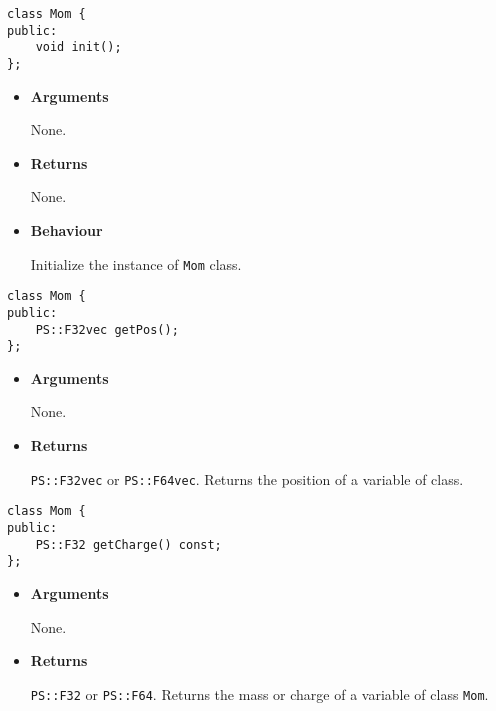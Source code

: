 
\begin{screen}
\begin{verbatim}
class Mom {
public:
    void init();
};
\end{verbatim}
\end{screen}

\begin{itemize}
  
\item {\bf Arguments}

  None.
  
\item {\bf Returns}

  None.

\item {\bf Behaviour}

  Initialize the instance of \texttt{Mom} class.

\end{itemize}


\begin{screen}
\begin{verbatim}
class Mom {
public:
    PS::F32vec getPos();
};
\end{verbatim}
\end{screen}

\begin{itemize}

\item {\bf Arguments}

  None.
  
\item {\bf Returns}

  \texttt{PS::F32vec} or \texttt{PS::F64vec}.
  Returns the position of a variable of class.

\end{itemize}


\begin{screen}
\begin{verbatim}
class Mom {
public:
    PS::F32 getCharge() const;
};
\end{verbatim}
\end{screen}

\begin{itemize}

\item {\bf Arguments}

  None.
  
\item {\bf Returns}

  \texttt{PS::F32} or \texttt{PS::F64}.
  Returns the mass or charge of a variable of class \texttt{Mom}.

\end{itemize}

